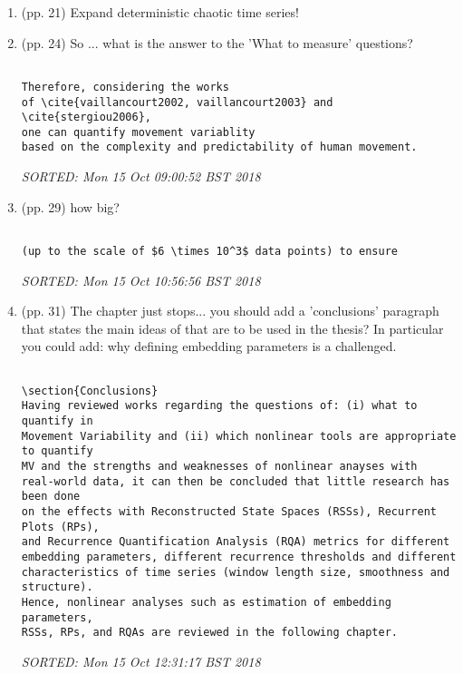 \documentclass[10pt]{article}
\begin{document}
\begin{enumerate}

\item (pp. 21) Expand deterministic chaotic time series!

\item (pp. 24) So ... what is the answer to the 'What to measure' 
	questions?


\begin{verbatim}

Therefore, considering the works 
of \cite{vaillancourt2002, vaillancourt2003} and \cite{stergiou2006},
one can quantify movement variablity 
based on the complexity and predictability of human movement.

\end{verbatim}
\textit{
SORTED: 
Mon 15 Oct 09:00:52 BST 2018
}
\\





\item (pp. 29) how big?

\begin{verbatim}

(up to the scale of $6 \times 10^3$ data points) to ensure 

\end{verbatim}
\textit{
SORTED: 
Mon 15 Oct 10:56:56 BST 2018
}
\\





\item (pp. 31) The chapter just stops... you should add a 'conclusions'
paragraph that states the main ideas of that are to be used in the thesis?
In particular you could add:
why defining embedding parameters is a challenged.



\begin{verbatim}

\section{Conclusions}
Having reviewed works regarding the questions of: (i) what to quantify in 
Movement Variability and (ii) which nonlinear tools are appropriate to quantify 
MV and the strengths and weaknesses of nonlinear anayses with 
real-world data, it can then be concluded that little research has been done 
on the effects with Reconstructed State Spaces (RSSs), Recurrent Plots (RPs), 
and Recurrence Quantification Analysis (RQA) metrics for different 
embedding parameters, different recurrence thresholds and different 
characteristics of time series (window length size, smoothness and structure).
Hence, nonlinear analyses such as estimation of embedding parameters, 
RSSs, RPs, and RQAs are reviewed in the following chapter.

\end{verbatim}
\textit{
SORTED: 
Mon 15 Oct 12:31:17 BST 2018
}
\\








\end{enumerate}
\end{document}
